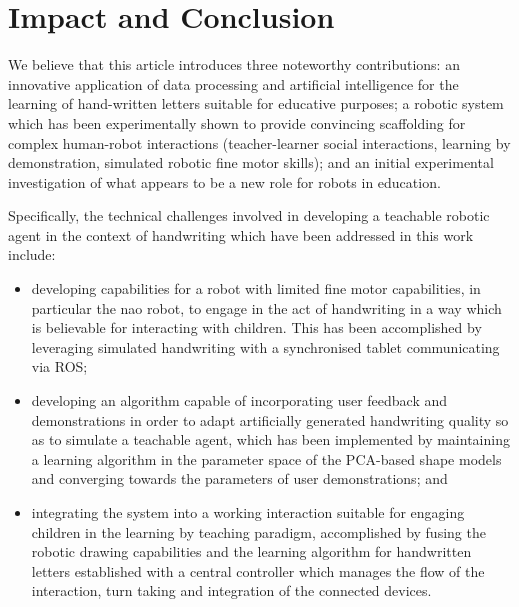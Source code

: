 \documentclass{sig-alternate}
\begin{document}
\section{Impact and Conclusion}\label{sec:conclusions}

We believe that this article introduces three noteworthy contributions: an innovative
application of data processing and artificial intelligence for the
learning of hand-written letters suitable for educative purposes; a robotic
system which has been experimentally shown to provide convincing scaffolding for
complex human-robot interactions (teacher-learner social interactions, learning by
demonstration, simulated robotic fine motor skills); and an initial experimental investigation of what appears to be a
new role for robots in education.

Specifically, the technical challenges involved in developing a teachable
robotic agent in the context of handwriting which have been addressed in this
work include:

\begin{itemize}

    \item developing capabilities for a robot with limited fine motor
        capabilities, in particular the {\sc nao} robot, to engage in the act of handwriting in a
        way which is believable for interacting with children. This has been
        accomplished by leveraging simulated handwriting with a synchronised
        tablet communicating via ROS;

    \item developing an algorithm capable of incorporating user feedback and
        demonstrations in order to adapt artificially generated handwriting quality so as
        to simulate a teachable agent, which has been implemented by maintaining
        a learning algorithm in the parameter space of the PCA-based shape models and
        converging towards the parameters of user demonstrations; and

    \item integrating the system into a working interaction suitable for
        engaging children in the learning by teaching paradigm, accomplished by
        fusing the robotic drawing capabilities and the learning algorithm for
        handwritten letters established with a central controller which manages
        the flow of the interaction, turn taking and integration of the connected 
	devices.

\end{itemize}
\end{document}
